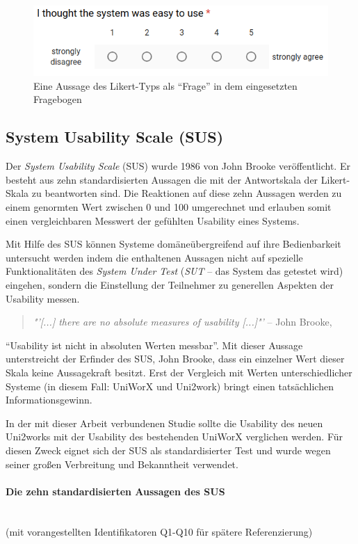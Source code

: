 \documentclass[11pt,a4paper,twoside,ngerman]{article}
\begin{document}
\begin{figure}[h]
    \centering
    \includegraphics[width=.8\textwidth]{images/likert-scale.png}
    \caption{Eine Aussage des Likert-Typs als "`Frage"' in dem eingesetzten Fragebogen}
    \label{fig:likert-scale-question}
\end{figure}

\subsection{System Usability Scale (SUS)} \label{sec:sus}
Der \emph{System Usability Scale} (SUS) wurde 1986 von John Brooke veröffentlicht. Er besteht aus zehn standardisierten Aussagen die mit der Antwortskala der Likert-Skala zu beantworten sind. Die Reaktionen auf diese zehn Aussagen werden zu einem genormten Wert zwischen 0 und 100 umgerechnet und erlauben somit einen vergleichbaren Messwert der gefühlten Usability eines Systems.

Mit Hilfe des SUS können Systeme domäneübergreifend auf ihre Bedienbarkeit untersucht werden indem die enthaltenen Aussagen nicht auf spezielle Funktionalitäten des \emph{System Under Test} (\emph{SUT} -- das System das getestet wird) eingehen, sondern die Einstellung der Teilnehmer zu generellen Aspekten der Usability messen.

\begin{quote}
\emph{"'[...] there are no absolute measures of usability [...]"'} -- John Brooke, \cite{brooke_sus}
\end{quote}
"`Usability ist nicht in absoluten Werten messbar"'. Mit dieser Aussage unterstreicht der Erfinder des SUS, John Brooke, dass ein einzelner Wert dieser Skala keine Aussagekraft besitzt. Erst der Vergleich mit Werten unterschiedlicher Systeme (in diesem Fall: UniWorX und Uni2work) bringt einen tatsächlichen Informationsgewinn. \cite{brooke_sus}

In der mit dieser Arbeit verbundenen Studie sollte die Usability des neuen Uni2works mit der Usability des bestehenden UniWorX verglichen werden. Für diesen Zweck eignet sich der SUS als standardisierter Test und wurde wegen seiner großen Verbreitung und Bekanntheit verwendet.

\paragraph{Die zehn standardisierten Aussagen des SUS}  \hfill \\
(mit vorangestellten Identifikatoren Q1-Q10 für spätere Referenzierung)
\end{document}
